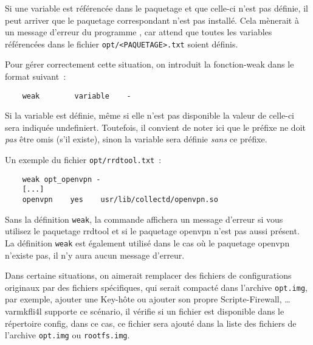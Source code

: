    Si une variable est référencée dans le paquetage et que celle-ci n'est pas
    définie, il peut arriver que le paquetage correspondant n’est pas installé.
    Cela mènerait à un message d'erreur du programme , car  attend
    que toutes les variables référencées dans le fichier \texttt{opt/<PAQUETAGE>.txt}
    soient définis.

    Pour gérer correctement cette situation, on introduit la fonction-\og{}weak\fg{}
    dans le format suivant~:

\begin{example}
\begin{verbatim}
    weak        variable    -
\end{verbatim}
\end{example}

    Si la variable est définie, même si elle n’est pas disponible la valeur de
	celle-ci sera indiquée \og{}undefiniert\fg{}. Toutefois, il convient de noter ici
	que le préfixe \og{}\fg{} ne doit \emph{pas} être omis (s'il existe),
	sinon la variable sera définie \emph{sans} ce préfixe.

    Un exemple du fichier \texttt{opt/rrdtool.txt}~:

\begin{example}
\begin{verbatim}
    weak opt_openvpn -
    [...]
    openvpn    yes    usr/lib/collectd/openvpn.so
\end{verbatim}
\end{example}

    Sans la définition \texttt{weak}, la commande  affichera un message
	d'erreur si vous utilisez le paquetage \og{}rrdtool\fg{} et si le paquetage \og{}openvpn\fg{}
	n'est pas aussi présent. La définition \texttt{weak} est également utilisé dans le cas
	où le paquetage \og{}openvpn\fg{} n'existe pas, il n'y aura aucun message d'erreur.



Dans certaine situations, on aimerait remplacer des fichiers de configurations
originaux par des fichiers spécifiques, qui serait compacté dans l’archive \texttt{opt.img},
par exemple, ajouter une Key-hôte ou ajouter son propre Scripte-Firewall, \ldots{}
var{mkfli4l} supporte ce scénario, il vérifie si un fichier est disponible dans le
répertoire config, dans ce cas, ce fichier sera ajouté dans la liste des fichiers de
l’archive \texttt{opt.img} ou \texttt{rootfs.img}.

